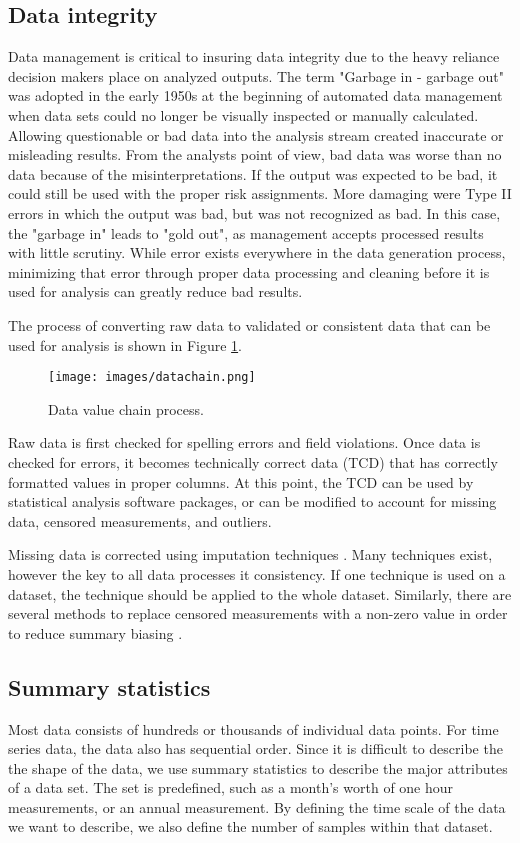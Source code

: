 \subsection{Data integrity}
Data management is critical to insuring data integrity due to the heavy reliance decision makers place on analyzed outputs. The term "Garbage in - garbage out" was adopted in the early 1950s at the beginning of automated data management when data sets could no longer be visually inspected or manually calculated. Allowing questionable or bad data into the analysis stream created inaccurate or misleading results. From the analysts point of view, bad data was worse than no data because of the misinterpretations. If the output was expected to be bad, it could still be used with the proper risk assignments. More damaging were Type II errors in which the output was bad, but was not recognized as bad. In this case, the "garbage in" leads to "gold out", as management accepts processed results with little scrutiny. While error exists everywhere in the data generation process, minimizing that error through proper data processing and cleaning before it is used for analysis can greatly reduce bad results.

The process of converting raw data to validated or consistent data that can be used for analysis is shown in Figure \ref{fig:datachain}.
%
\begin{figure}[!htpb]
\centering
\texttt{[image: images/datachain.png]} 
\caption{Data value chain process.}
\label{fig:datachain}
\end{figure}
%
Raw data is first checked for spelling errors and field violations. Once data is checked for errors, it becomes technically correct data (TCD) that has correctly formatted values in proper columns. At this point, the TCD can be used by statistical analysis software packages, or can be modified to account for missing data, censored measurements, and outliers.

Missing data is corrected using imputation techniques \citep{Horton2007, Ellington2015}. Many techniques exist, however the key to all data processes it consistency. If one technique is used on a dataset, the technique should be applied to the whole dataset. Similarly, there are several methods to replace censored measurements with a non-zero value in order to reduce summary biasing \citep{Helsel2011}.

\subsection{Summary statistics}
Most data consists of hundreds or thousands of individual data points. For time series data, the data also has sequential order. Since it is difficult to describe the the shape of the data, we use summary statistics to describe the major attributes of a data set. The set is predefined, such as a month's worth of one hour measurements, or an annual measurement. By defining the time scale of the data we want to describe, we also define the number of samples within that dataset.

